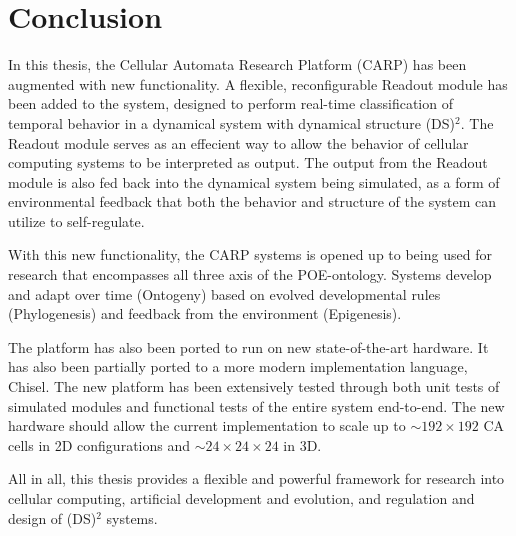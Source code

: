 \chapter{Conclusion}

In this thesis, the Cellular Automata Research Platform (CARP) has been
augmented with new functionality. A flexible, reconfigurable Readout module has
been added to the system, designed to perform real-time classification of
temporal behavior in a dynamical system with dynamical structure (DS)$^2$. The
Readout module serves as an effecient way to allow the behavior of cellular
computing systems to be interpreted as output. The output from the Readout
module is also fed back into the dynamical system being simulated, as a form of
environmental feedback that both the behavior and structure of the system can
utilize to self-regulate.

With this new functionality, the CARP systems is opened up to being used for
research that encompasses all three axis of the POE-ontology. Systems develop
and adapt over time (Ontogeny) based on evolved developmental rules
(Phylogenesis) and feedback from the environment (Epigenesis).

The platform has also been ported to run on new state-of-the-art hardware. It
has also been partially ported to a more modern implementation language, Chisel.
The new platform has been extensively tested through both unit tests of
simulated modules and functional tests of the entire system end-to-end. The new
hardware should allow the current implementation to scale up to $\sim
192\times192$ CA cells in 2D configurations and $\sim 24\times24\times24$ in 3D.

All in all, this thesis provides a flexible and powerful framework for research
into cellular computing, artificial development and evolution, and regulation
and design of (DS)$^2$ systems.

\cleardoublepage